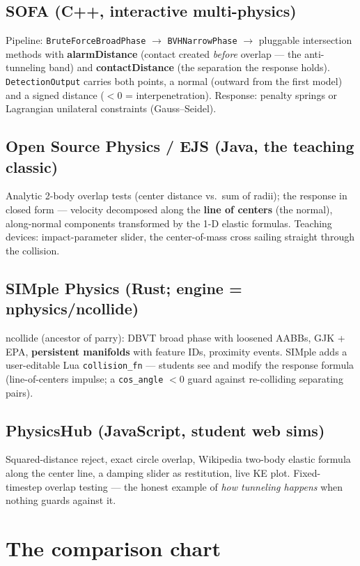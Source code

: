 \documentclass[11pt]{article}
\newcommand{\code}[1]{\texttt{#1}}
\begin{document}
\subsection{SOFA (C++, interactive multi-physics)}
Pipeline: \code{BruteForceBroadPhase} $\to$ \code{BVHNarrowPhase} $\to$
pluggable intersection methods with \textbf{alarmDistance} (contact created
\emph{before} overlap --- the anti-tunneling band) and \textbf{contactDistance}
(the separation the response holds). \code{DetectionOutput} carries both
points, a normal (outward from the first model) and a signed distance
($< 0$ = interpenetration). Response: penalty springs or Lagrangian
unilateral constraints (Gauss--Seidel).

\subsection{Open Source Physics / EJS (Java, the teaching classic)}
Analytic 2-body overlap tests (center distance vs.\ sum of radii); the response
in closed form --- velocity decomposed along the \textbf{line of centers} (the
normal), along-normal components transformed by the 1-D elastic formulas.
Teaching devices: impact-parameter slider, the center-of-mass cross sailing
straight through the collision.

\subsection{SIMple Physics (Rust; engine = nphysics/ncollide)}
ncollide (ancestor of parry): DBVT broad phase with loosened AABBs, GJK + EPA,
\textbf{persistent manifolds} with feature IDs, proximity events. SIMple adds
a user-editable Lua \code{collision\_fn} --- students see and modify the
response formula (line-of-centers impulse; a \code{cos\_angle} $< 0$ guard
against re-colliding separating pairs).

\subsection{PhysicsHub (JavaScript, student web sims)}
Squared-distance reject, exact circle overlap, Wikipedia two-body elastic
formula along the center line, a damping slider as restitution, live KE plot.
Fixed-timestep overlap testing --- the honest example of \emph{how tunneling
happens} when nothing guards against it.

\section{The comparison chart}
\end{document}
